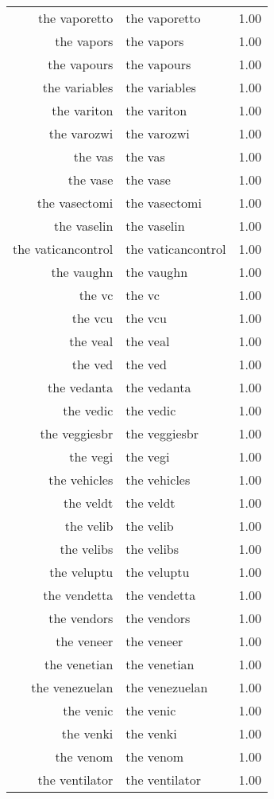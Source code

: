 \begin{table}[ht]
\begin{tabular}{rlr}
  the vaporetto & the vaporetto & 1.00 \\ 
  the vapors & the vapors & 1.00 \\ 
  the vapours & the vapours & 1.00 \\ 
  the variables & the variables & 1.00 \\ 
  the variton & the variton & 1.00 \\ 
  the varozwi & the varozwi & 1.00 \\ 
  the vas & the vas & 1.00 \\ 
  the vase & the vase & 1.00 \\ 
  the vasectomi & the vasectomi & 1.00 \\ 
  the vaselin & the vaselin & 1.00 \\ 
  the vaticancontrol & the vaticancontrol & 1.00 \\ 
  the vaughn & the vaughn & 1.00 \\ 
  the vc & the vc & 1.00 \\ 
  the vcu & the vcu & 1.00 \\ 
  the veal & the veal & 1.00 \\ 
  the ved & the ved & 1.00 \\ 
  the vedanta & the vedanta & 1.00 \\ 
  the vedic & the vedic & 1.00 \\ 
  the veggiesbr & the veggiesbr & 1.00 \\ 
  the vegi & the vegi & 1.00 \\ 
  the vehicles & the vehicles & 1.00 \\ 
  the veldt & the veldt & 1.00 \\ 
  the velib & the velib & 1.00 \\ 
  the velibs & the velibs & 1.00 \\ 
  the veluptu & the veluptu & 1.00 \\ 
  the vendetta & the vendetta & 1.00 \\ 
  the vendors & the vendors & 1.00 \\ 
  the veneer & the veneer & 1.00 \\ 
  the venetian & the venetian & 1.00 \\ 
  the venezuelan & the venezuelan & 1.00 \\ 
  the venic & the venic & 1.00 \\ 
  the venki & the venki & 1.00 \\ 
  the venom & the venom & 1.00 \\ 
  the ventilator & the ventilator & 1.00 \\ 

\end{tabular}
\end{table}
